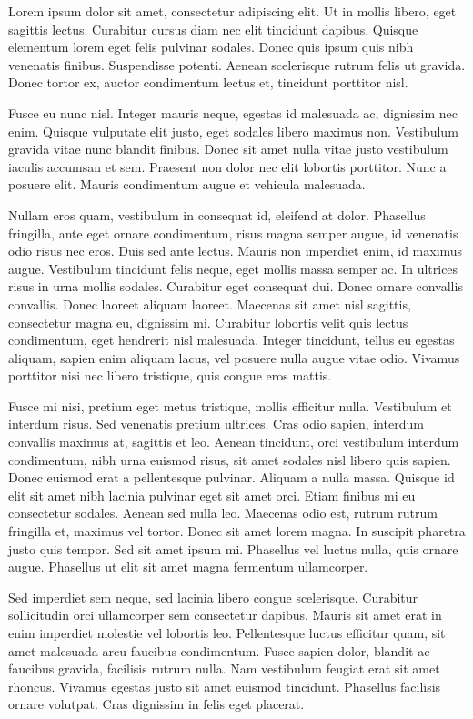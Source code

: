 \documentclass[a4paper,landscape,12pt]{article}
\begin{document}
\newpage

Lorem ipsum dolor sit amet, consectetur adipiscing elit. Ut in mollis libero, eget sagittis lectus. Curabitur cursus diam nec elit tincidunt dapibus. Quisque elementum lorem eget felis pulvinar sodales. Donec quis ipsum quis nibh venenatis finibus. Suspendisse potenti. Aenean scelerisque rutrum felis ut gravida. Donec tortor ex, auctor condimentum lectus et, tincidunt porttitor nisl.

Fusce eu nunc nisl. Integer mauris neque, egestas id malesuada ac, dignissim nec enim. Quisque vulputate elit justo, eget sodales libero maximus non. Vestibulum gravida vitae nunc blandit finibus. Donec sit amet nulla vitae justo vestibulum iaculis accumsan et sem. Praesent non dolor nec elit lobortis porttitor. Nunc a posuere elit. Mauris condimentum augue et vehicula malesuada.

Nullam eros quam, vestibulum in consequat id, eleifend at dolor. Phasellus fringilla, ante eget ornare condimentum, risus magna semper augue, id venenatis odio risus nec eros. Duis sed ante lectus. Mauris non imperdiet enim, id maximus augue. Vestibulum tincidunt felis neque, eget mollis massa semper ac. In ultrices risus in urna mollis sodales. Curabitur eget consequat dui. Donec ornare convallis convallis. Donec laoreet aliquam laoreet. Maecenas sit amet nisl sagittis, consectetur magna eu, dignissim mi. Curabitur lobortis velit quis lectus condimentum, eget hendrerit nisl malesuada. Integer tincidunt, tellus eu egestas aliquam, sapien enim aliquam lacus, vel posuere nulla augue vitae odio. Vivamus porttitor nisi nec libero tristique, quis congue eros mattis.

Fusce mi nisi, pretium eget metus tristique, mollis efficitur nulla. Vestibulum et interdum risus. Sed venenatis pretium ultrices. Cras odio sapien, interdum convallis maximus at, sagittis et leo. Aenean tincidunt, orci vestibulum interdum condimentum, nibh urna euismod risus, sit amet sodales nisl libero quis sapien. Donec euismod erat a pellentesque pulvinar. Aliquam a nulla massa. Quisque id elit sit amet nibh lacinia pulvinar eget sit amet orci. Etiam finibus mi eu consectetur sodales. Aenean sed nulla leo. Maecenas odio est, rutrum rutrum fringilla et, maximus vel tortor. Donec sit amet lorem magna. In suscipit pharetra justo quis tempor. Sed sit amet ipsum mi. Phasellus vel luctus nulla, quis ornare augue. Phasellus ut elit sit amet magna fermentum ullamcorper.

Sed imperdiet sem neque, sed lacinia libero congue scelerisque. Curabitur sollicitudin orci ullamcorper sem consectetur dapibus. Mauris sit amet erat in enim imperdiet molestie vel lobortis leo. Pellentesque luctus efficitur quam, sit amet malesuada arcu faucibus condimentum. Fusce sapien dolor, blandit ac faucibus gravida, facilisis rutrum nulla. Nam vestibulum feugiat erat sit amet rhoncus. Vivamus egestas justo sit amet euismod tincidunt. Phasellus facilisis ornare volutpat. Cras dignissim in felis eget placerat.
\end{document}
